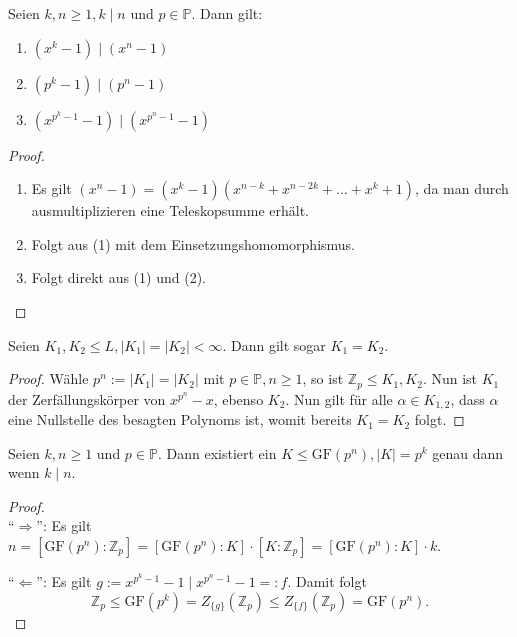\begin{lemma}
    Seien $k, n \geq 1, k \mid n$ und $p \in \mathbb{P}$. Dann gilt:
    \begin{enumerate}
        \item $(x^k - 1) \mid (x^n - 1)$
        \item $(p^k - 1) \mid (p^n - 1)$
        \item $(x^{p^k - 1} - 1) \mid (x^{p^n - 1} - 1)$
    \end{enumerate}
\end{lemma}

\begin{proof}{\ }
    \begin{enumerate}
        \item Es gilt $(x^n - 1) = (x^k - 1)(x^{n-k} + x^{n - 2k} + \hdots + x^k + 1)$, da man durch ausmultiplizieren eine Teleskopsumme erhält. 
        \item Folgt aus (1) mit dem Einsetzungshomomorphismus.
        \item Folgt direkt aus (1) und (2).
    \end{enumerate}
\end{proof}

\begin{lemma}
    Seien $K_1, K_2 \leq L, \vert K_1 \vert = \vert K_2 \vert<\infty$. Dann gilt sogar $K_1 = K_2$.
\end{lemma}

\begin{proof}
    Wähle $p^n := \vert K_1 \vert = \vert K_2 \vert$ mit $p \in \mathbb{P}, n \geq 1$, so ist $\mathbb{Z}_p \leq K_1, K_2$. Nun ist $K_1$ der Zerfällungskörper von $x^{p^n} - x$, ebenso $K_2$. Nun gilt für alle $\alpha \in K_{1,2}$, dass $\alpha$ eine Nullstelle des besagten Polynoms ist, womit bereits $K_1 = K_2$ folgt.
\end{proof}

\begin{proposition}
    Seien $k, n \geq 1$ und $p \in \mathbb{P}$. Dann existiert ein $K \leq \mathrm{GF}(p^n), \vert K \vert = p^k$ genau dann wenn $k \mid n$.
\end{proposition}

\begin{proof}{\ } \\
    ``$\Rightarrow$'': Es gilt $n = [\mathrm{GF}(p^n) : \mathbb{Z}_p] = [\mathrm{GF}(p^n) : K] \cdot [K : \mathbb{Z}_p] = [\mathrm{GF}(p^n) : K] \cdot k$.

    ``$\Leftarrow$'': Es gilt $g := x^{p^k - 1} - 1 \mid x^{p^n - 1} - 1 =: f$.
    Damit folgt
    $$ \mathbb{Z}_p \leq \mathrm{GF}(p^k) = Z_{\{g\}}(\mathbb{Z}_p) \leq Z_{\{f\}}(\mathbb{Z}_p) = \mathrm{GF}(p^n). $$
\end{proof}

